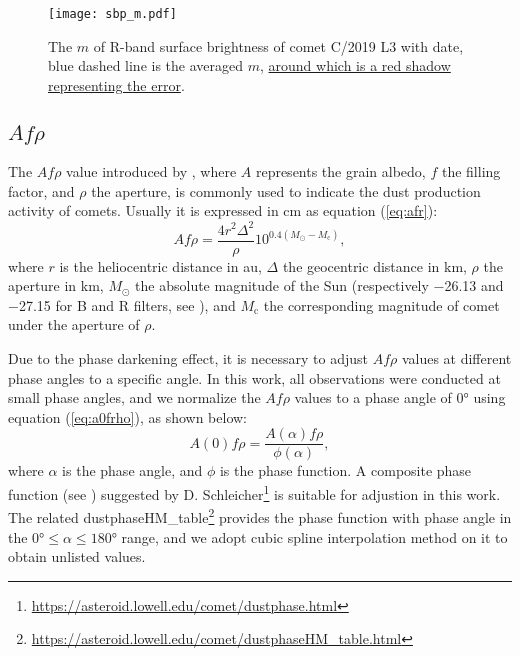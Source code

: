 \begin{figure}
    \centering
    \texttt{[image: sbp\_m.pdf]}
    \caption{The $m$ of R-band surface brightness of comet C/2019 L3 with date, blue dashed line is the averaged $m$, \ul{around which is a red shadow representing the error}. }
    \label{fig:sbp_m}
\end{figure}


\subsection{$Af\rho$}

The $Af\rho$ value introduced by \citet{ahearn_comet_1984}, where $A$ represents the grain albedo, $f$ the filling factor, and $\rho$ the aperture, is commonly used to indicate the dust production activity of comets. Usually it is expressed in \si{\cm} as equation (\ref{eq:afr}): 
\begin{equation}
    Af\rho = \frac{4 r^2 \Delta^2}{\rho} 10^{0.4(M_\odot - M_\mathrm{c})}, 
    \label{eq:afr}
\end{equation}
where $r$ is the heliocentric distance in \si{\astronomicalunit}, $\Delta$ the geocentric distance in \si{\km}, $\rho$ the aperture in \si{\km}, $M_\odot$ the absolute magnitude of the Sun (respectively \num{-26.13} and \num{-27.15} for B and R filters, see \citealt{willmer_absolute_2018}), and $M_\mathrm{c}$ the corresponding magnitude of comet under the aperture of $\rho$. 

Due to the phase darkening effect, it is necessary to adjust $Af\rho$ values at different phase angles to a specific angle. In this work, all observations were conducted at small phase angles, and we normalize the $Af\rho$ values to a phase angle of \ang{0} using equation (\ref{eq:a0frho}), as shown below:
\begin{equation}
    A(0)f\rho = \frac{A(\alpha)f\rho}{\phi(\alpha)}, \label{eq:a0frho}
\end{equation}
where $\alpha$ is the phase angle, and $\phi$ is the phase function. A composite phase function (see \citealt{schleicher_composition_2011, marcus_forward-scattering_2007}) suggested by D. Schleicher\footnote{\href{https://asteroid.lowell.edu/comet/dustphase.html}{https://asteroid.lowell.edu/comet/dustphase.html}} is suitable for adjustion in this work. The related dustphaseHM\_table\footnote{\href{https://asteroid.lowell.edu/comet/dustphaseHM_table.html}{https://asteroid.lowell.edu/comet/dustphaseHM\_table.html}} provides the phase function with phase angle in the $\ang{0} \leqslant \alpha \leqslant \ang{180}$ range, and we adopt cubic spline interpolation method on it to obtain unlisted values. 

